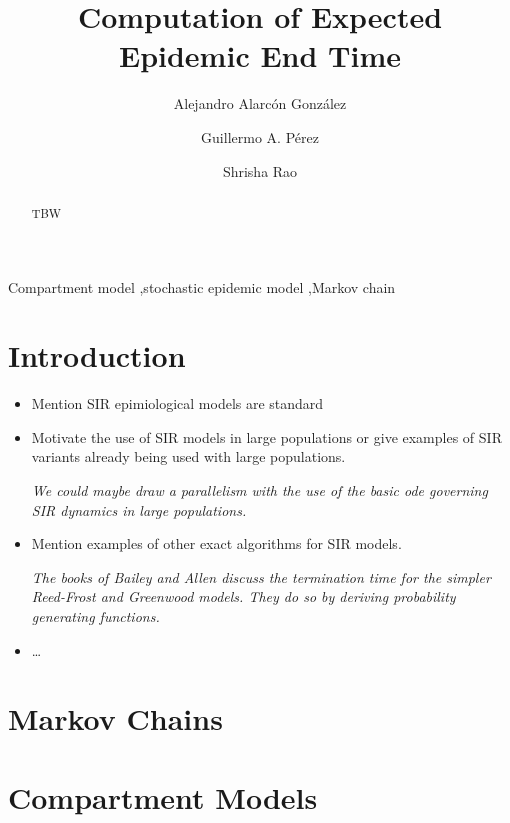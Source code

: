 \documentclass[a4paper,preprint]{elsarticle}
\begin{document}
\title{Computation of Expected Epidemic End Time}

\author[1]{Alejandro Alarc\'on Gonz\'alez}
\author[1]{Guillermo A. P\'erez}
\author[1]{Shrisha Rao}

\begin{abstract}
  TBW
\end{abstract}

\begin{keyword}
  Compartment model \sep stochastic epidemic model \sep Markov chain
\end{keyword}

\maketitle

\section{Introduction}
\begin{itemize}
    \item Mention SIR epimiological models are standard
    \item Motivate the use of SIR models in large populations or give examples of SIR variants already being used with large populations.
    
    \textit{We could maybe draw a parallelism with the use of the basic ode governing SIR dynamics in large populations.}
    \item Mention examples of other exact algorithms for SIR models.
    
    \textit{The books of Bailey and Allen discuss the termination time for the simpler Reed-Frost and Greenwood models. They do so by deriving probability generating functions.} 
    \item \dots
\end{itemize}

\section{Markov Chains}

\section{Compartment Models}
\end{document}
